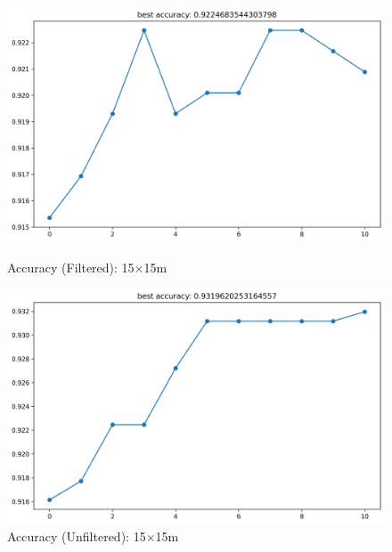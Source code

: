 \documentclass[runningheads]{llncs}
\begin{document}
\begin{figure}[H]
	\centering
	\begin{minipage}{0.49\textwidth}
		\centering
		\includegraphics[width=\textwidth]{figures/filtered/svm_acc_15.png}
		\caption*{Accuracy (Filtered): 15×15m}
	\end{minipage}
	\hfill
	\begin{minipage}{0.49\textwidth}
		\centering
		\includegraphics[width=\textwidth]{figures/unfiltered/svm_acc_15.png}
		\caption*{Accuracy (Unfiltered): 15×15m}
	\end{minipage}
\end{figure}
\end{document}
